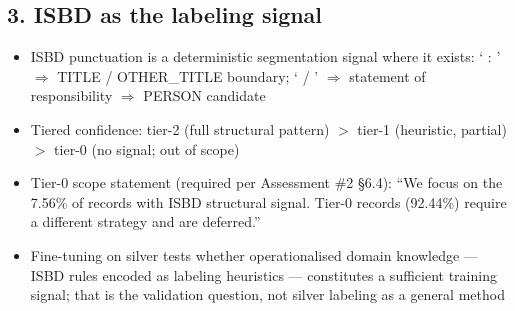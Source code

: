 \subsection*{3. ISBD as the labeling signal}
\begin{itemize}
    \item ISBD punctuation is a deterministic segmentation signal where it exists:
          ` : ' $\Rightarrow$ TITLE / OTHER\_TITLE boundary;
          ` / ' $\Rightarrow$ statement of responsibility $\Rightarrow$ PERSON candidate
    \item Tiered confidence: tier-2 (full structural pattern) $>$ tier-1
          (heuristic, partial) $>$ tier-0 (no signal; out of scope)
    \item Tier-0 scope statement (required per Assessment \#2 §6.4):
          ``We focus on the 7.56\% of records with ISBD structural signal.
          Tier-0 records (92.44\%) require a different strategy and are deferred.''
    \item Fine-tuning on silver tests whether operationalised domain knowledge ---
          ISBD rules encoded as labeling heuristics --- constitutes a sufficient
          training signal; that is the validation question, not silver labeling
          as a general method
\end{itemize}

